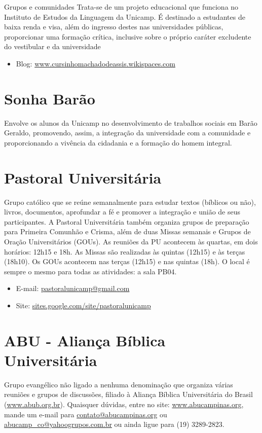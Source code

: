 \begin{story}{Grupos e comunidades}
Trata-se de um projeto educacional que funciona no Instituto de Estudos da Linguagem da Unicamp. É destinado a estudantes de baixa renda e visa, além do ingresso destes nas universidades públicas, proporcionar uma formação crítica, inclusive sobre o próprio caráter excludente do vestibular e da universidade

\begin{itemize}
\item Blog: \url{www.cursinhomachadodeassis.wikispaces.com}
\end{itemize}

\section*{Sonha Barão}

Envolve os alunos da Unicamp no desenvolvimento de trabalhos sociais em Barão Geraldo, promovendo, assim, a integração da universidade com a comunidade e proporcionando a vivência da cidadania e a formação do homem integral.

\section*{Pastoral Universitária}

Grupo católico que se reúne semanalmente para estudar textos (bíblicos ou não), livros, documentos, aprofundar a fé e promover a integração e união de seus participantes. A Pastoral Universitária também organiza grupos de preparação para Primeira Comunhão e Crisma, além de duas Missas semanais e Grupos de Oração Universitários (GOUs). As reuniões da PU acontecem às quartas, em dois horários: 12h15 e 18h. As Missas são realizadas às quintas (12h15) e às terças (18h10). Os GOUs acontecem nas terças (12h15) e nas quintas (18h). O local é sempre o mesmo para todas as atividades: a sala PB04.

\begin{itemize}
\item E-mail: \url{pastoralunicamp@gmail.com}
\item Site: \url{sites.google.com/site/pastoralunicamp}
\end{itemize}

\section*{ABU - Aliança Bíblica Universitária}

Grupo evangélico não ligado a nenhuma denominação que organiza várias reuniões e grupos de discussões, filiado à Aliança Bíblica Universitária do Brasil (\url{www.abub.org.br}). Quaisquer dúvidas, entre no site: \url{www.abucampinas.org}, mande um e-mail para \url{contato@abucampinas.org} ou \url{abucamp_co@yahoogrupos.com.br} ou ainda ligue para (19) 3289-2823.

\end{story}